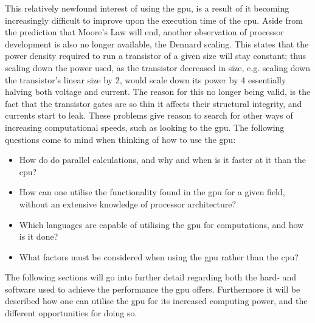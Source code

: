 This relatively newfound interest of using the \acrshort{gpu}, is a result of it becoming increasingly difficult to improve upon the execution time of the \acrshort{cpu}.
Aside from the prediction that Moore's Law will end, another observation of processor development is also no longer available, the Dennard scaling.
This states that the power density required to run a transistor of a given size will stay constant; thus scaling down the power used, as the transistor decreased in size, e.g. scaling down the transistor's linear size by 2, would scale down its power by 4 essentially halving both voltage and current. \citep{DennardScaling}
The reason for this no longer being valid, is the fact that the transistor gates are so thin it affects their structural integrity, and currents start to leak. \citep{CPUClockSpeeds}
These problems give reason to search for other ways of increasing computational speeds, such as looking to the \acrshort{gpu}.
The following questions come to mind when thinking of how to use the \acrshort{gpu}:


\begin{itemize}
	\item How do  do parallel calculations, and why and when is it faster at it than the \acrshort{cpu}?
	\item How can one utilise the functionality found in the \acrshort{gpu} for a given field, without an extensive knowledge of processor architecture? 
	\item Which languages are capable of utilising the \acrshort{gpu} for computations, and how is it done?
	\item What factors must be considered when using the \acrshort{gpu} rather than the \acrshort{cpu}? 
\end{itemize}

The following sections will go into further detail regarding both the hard- and software used to achieve the performance the \acrshort{gpu} offers.
Furthermore it will be described how one can utilise the \acrshort{gpu} for its increased computing power, and the different opportunities for doing so.


